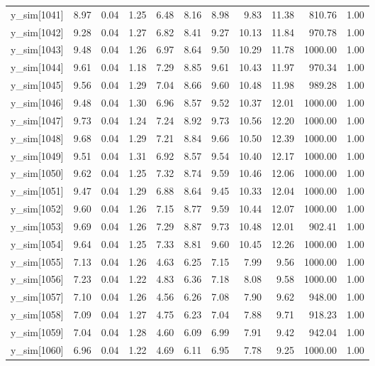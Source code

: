\begin{table}[ht]
\begin{tabular}{rrrrrrrrrrr}
  y\_sim[1041] & 8.97 & 0.04 & 1.25 & 6.48 & 8.16 & 8.98 & 9.83 & 11.38 & 810.76 & 1.00 \\ 
  y\_sim[1042] & 9.28 & 0.04 & 1.27 & 6.82 & 8.41 & 9.27 & 10.13 & 11.84 & 970.78 & 1.00 \\ 
  y\_sim[1043] & 9.48 & 0.04 & 1.26 & 6.97 & 8.64 & 9.50 & 10.29 & 11.78 & 1000.00 & 1.00 \\ 
  y\_sim[1044] & 9.61 & 0.04 & 1.18 & 7.29 & 8.85 & 9.61 & 10.43 & 11.97 & 970.34 & 1.00 \\ 
  y\_sim[1045] & 9.56 & 0.04 & 1.29 & 7.04 & 8.66 & 9.60 & 10.48 & 11.98 & 989.28 & 1.00 \\ 
  y\_sim[1046] & 9.48 & 0.04 & 1.30 & 6.96 & 8.57 & 9.52 & 10.37 & 12.01 & 1000.00 & 1.00 \\ 
  y\_sim[1047] & 9.73 & 0.04 & 1.24 & 7.24 & 8.92 & 9.73 & 10.56 & 12.20 & 1000.00 & 1.00 \\ 
  y\_sim[1048] & 9.68 & 0.04 & 1.29 & 7.21 & 8.84 & 9.66 & 10.50 & 12.39 & 1000.00 & 1.00 \\ 
  y\_sim[1049] & 9.51 & 0.04 & 1.31 & 6.92 & 8.57 & 9.54 & 10.40 & 12.17 & 1000.00 & 1.00 \\ 
  y\_sim[1050] & 9.62 & 0.04 & 1.25 & 7.32 & 8.74 & 9.59 & 10.46 & 12.06 & 1000.00 & 1.00 \\ 
  y\_sim[1051] & 9.47 & 0.04 & 1.29 & 6.88 & 8.64 & 9.45 & 10.33 & 12.04 & 1000.00 & 1.00 \\ 
  y\_sim[1052] & 9.60 & 0.04 & 1.26 & 7.15 & 8.77 & 9.59 & 10.44 & 12.07 & 1000.00 & 1.00 \\ 
  y\_sim[1053] & 9.69 & 0.04 & 1.26 & 7.29 & 8.87 & 9.73 & 10.48 & 12.01 & 902.41 & 1.00 \\ 
  y\_sim[1054] & 9.64 & 0.04 & 1.25 & 7.33 & 8.81 & 9.60 & 10.45 & 12.26 & 1000.00 & 1.00 \\ 
  y\_sim[1055] & 7.13 & 0.04 & 1.26 & 4.63 & 6.25 & 7.15 & 7.99 & 9.56 & 1000.00 & 1.00 \\ 
  y\_sim[1056] & 7.23 & 0.04 & 1.22 & 4.83 & 6.36 & 7.18 & 8.08 & 9.58 & 1000.00 & 1.00 \\ 
  y\_sim[1057] & 7.10 & 0.04 & 1.26 & 4.56 & 6.26 & 7.08 & 7.90 & 9.62 & 948.00 & 1.00 \\ 
  y\_sim[1058] & 7.09 & 0.04 & 1.27 & 4.75 & 6.23 & 7.04 & 7.88 & 9.71 & 918.23 & 1.00 \\ 
  y\_sim[1059] & 7.04 & 0.04 & 1.28 & 4.60 & 6.09 & 6.99 & 7.91 & 9.42 & 942.04 & 1.00 \\ 
  y\_sim[1060] & 6.96 & 0.04 & 1.22 & 4.69 & 6.11 & 6.95 & 7.78 & 9.25 & 1000.00 & 1.00 \\ 

\end{tabular}
\end{table}
